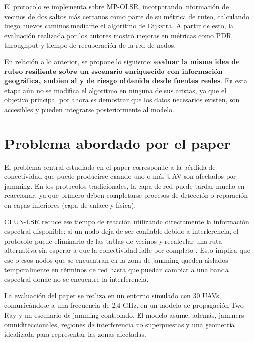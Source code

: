 \documentclass[journal,10pt]{IEEEtran}
\begin{document}
El protocolo se implementa sobre MP-OLSR, incorporando información de vecinos de dos saltos más cercanos como
parte de su métrica de ruteo, calculando luego nuevos caminos mediante el algoritmo de Dijkstra. A partir de esto, la
evaluación realizada por los autores mostró mejoras en métricas como PDR, throughput y tiempo
de recuperación de la red de nodos.

 En relación a lo anterior, se propone lo siguiente:
\textbf{evaluar la misma idea de ruteo resiliente sobre un escenario enriquecido con información
geográfica, ambiental y de riesgo obtenida desde fuentes reales}. En esta etapa aún no se modifica
el algoritmo en ninguna de sus aristas, ya que el objetivo principal por ahora es demostrar que los datos necesarios existen,
son accesibles y pueden integrarse posteriormente al modelo.

\section{Problema abordado por el paper}

El problema central estudiado en el paper corresponde a la pérdida de conectividad que puede
producirse cuando uno o más UAV son afectados por jamming. En los protocolos tradicionales, la
capa de red puede tardar mucho en reaccionar, ya que primero deben completarse procesos de detección o
reparación en capas inferiores (capa de enlace y física).

CLUN-LSR reduce ese tiempo de reacción utilizando directamente la información espectral
disponible: si un nodo deja de ser confiable debido a interferencia, el protocolo puede
eliminarlo de las tablas de vecinos y recalcular una ruta alternativa sin esperar a que la
conectividad falle por completo \cite{clunlsr}. Esto implica que ese o esos nodos que se encuentran en la zona de jamming queden aislados temporalmente en términos de red hasta que puedan cambiar a una banda espectral donde no se encuentre la interferencia.

La evaluación del paper se realiza en un entorno simulado con 30 UAVs, comunicándose a una frecuencia de 2,4 GHz, en
un modelo de propagación Two-Ray y un escenario de jamming controlado. El modelo asume, además,
jammers omnidireccionales, regiones de interferencia no superpuestas y una geometría idealizada
para representar las zonas afectadas.
\end{document}
